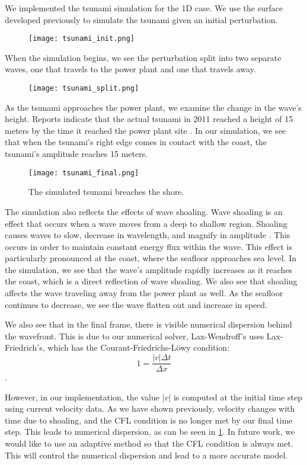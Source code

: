 \documentclass[../main.tex]{subfiles}
\begin{document}
We implemented the tsunami simulation for the 1D case.  We use the surface developed previously to simulate the tsunami given an initial perturbation. 

\begin{figure}[H]
\centering
\texttt{[image: tsunami\_init.png]}
\end{figure}

\noindent When the simulation begins, we see the perturbation split into two separate waves, one that travels to the power plant and one that travels away.

\begin{figure}[H]
\centering
\texttt{[image: tsunami\_split.png]}
\end{figure}


\noindent As the tsunami approaches the power plant, we examine the change in the wave's height.  Reports indicate that the actual tsunami in 2011 reached a height of 15 meters by the time it reached the power plant site \cite{nuclearAssociation}.  In our simulation, we see that when the tsunami's right edge comes in contact with the coast, the tsunami's amplitude reaches 15 meters.

\begin{figure}[H]
\centering
\texttt{[image: tsunami\_final.png]}
\caption{The simulated tsunami breaches the shore.}
\label{tsunamiFinal}
\end{figure}

\noindent The simulation also reflects the effects of wave shoaling.  Wave shoaling is an effect that occurs when a wave moves from a deep to shallow region.  Shoaling causes waves to slow, decrease in wavelength, and magnify in amplitude \cite{zirker}.  This occurs in order to maintain constant energy flux within the wave.  This effect is particularly pronounced at the coast, where the seafloor approaches sea level.  In the simulation, we see that the wave's amplitude rapidly increases as it reaches the
coast, which is a direct reflection of wave shoaling.  We also see that shoaling affects the wave traveling away from the power plant as well.  As the seafloor continues to decrease, we see the wave flatten out and increase in speed. \newline


\noindent We also see that in the final frame, there is visible numerical dispersion behind the wavefront.  This is due to our numerical solver, Lax-Wendroff's uses Lax-Friedrich's, which has the Courant-Friedrichs-L\"owy condition:
$$ 1 = \frac{|v|\Delta t}{\Delta x}$$.

\noindent However, in our implementation, the value $|v|$ is computed at the initial time step using current velocity data.  As we have shown previously, velocity changes with time due to shoaling, and the CFL condition is no longer met by our final time step.  This leads to numerical dispersion, as can be seen in \ref{tsunamiFinal}.  In future work, we would like to use an adaptive method so that the CFL condition is always met.  This will control the numerical dispersion and lead to a more accurate model.
\end{document}
